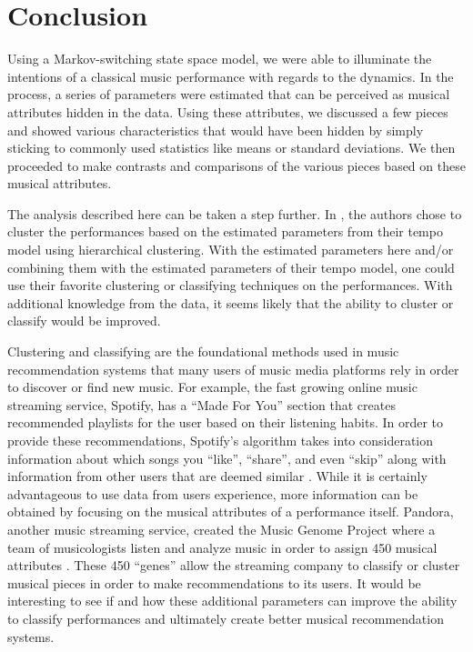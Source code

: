\documentclass[12pt]{article}
\begin{document}
\section{Conclusion}
\label{sec:conclusion}

Using a Markov-switching state space model, we were able to illuminate
the intentions of a classical music performance with regards to the
dynamics. In the process, a series of parameters were estimated that can
be perceived as musical attributes hidden in the data. Using these
attributes, we discussed a few pieces and showed various characteristics
that would have been hidden by simply sticking to commonly used
statistics like means or standard deviations. We then proceeded to make
contrasts and comparisons of the various pieces based on these musical
attributes.

The analysis described here can be taken a step further. In
\cite{mcdonald_markov-switching_2019}, the authors chose to cluster the
performances based on the estimated parameters from their tempo model
using hierarchical clustering. With the estimated parameters here and/or
combining them with the estimated parameters of their tempo model, one
could use their favorite clustering or classifying techniques on the
performances. With additional knowledge from the data, it seems likely
that the ability to cluster or classify would be improved.

Clustering and classifying are the foundational methods used in music
recommendation systems that many users of music media platforms rely in
order to discover or find new music. For example, the fast growing
online music streaming service, Spotify, has a ``Made For You'' section
that creates recommended playlists for the user based on their listening
habits. In order to provide these recommendations, Spotify's algorithm
takes into consideration information about which songs you ``like'',
``share'', and even ``skip'' along with information from other users
that are deemed similar \citep{spotify_spotify_2019}. While it is
certainly advantageous to use data from users experience, more
information can be obtained by focusing on the musical attributes of a
performance itself. Pandora, another music streaming service, created
the Music Genome Project where a team of musicologists listen and
analyze music in order to assign 450 musical attributes
\citep{pandora_music_2020}. These 450 ``genes'' allow the streaming
company to classify or cluster musical pieces in order to make
recommendations to its users. It would be interesting to see if and how
these additional parameters can improve the ability to classify
performances and ultimately create better musical recommendation
systems.
\end{document}

